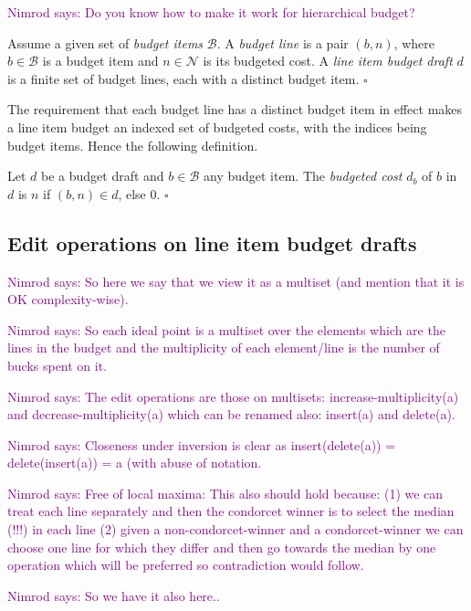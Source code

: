 \documentclass[sigconf]{aamas}  %
\newcommand{\nimrod}[1]{\textcolor{purple}{Nimrod says: #1}}
\newcommand{\qqed}{\hfill$\square$}
\newcommand{\calB}{\mathcal{B}}
\begin{document}
\nimrod{Do you know how to make it work for hierarchical budget?}

\begin{definition}
Assume a given set of \emph{budget items} $\calB$. A \emph{budget line} is a pair $(b,n)$, where $b \in \calB$ is a budget item and $n \in \mathcal{N}$ is its budgeted cost.  A \emph{line item budget draft} $d$ is a finite set of budget lines, each with a distinct budget item.
\qqed
\end{definition}


The requirement that each budget line has a distinct budget item in effect makes a line item budget an indexed set of budgeted costs, with the indices being
budget items.  Hence the following definition.


\begin{definition}
Let $d$ be a budget draft and $b \in \calB$  any budget item. The \emph{budgeted cost} $d_b$ of $b$ in $d$ is $n$ if $(b,n) \in d$, else 0.
\qqed
\end{definition}


\subsection{Edit operations on line item budget drafts}

\nimrod{So here we say that we view it as a multiset (and mention that it is OK complexity-wise).}

\nimrod{So each ideal point is a multiset over the elements which are the lines in the budget and the multiplicity of each element/line is the number of bucks spent on it.}

\nimrod{The edit operations are those on multisets: increase-multiplicity(a) and decrease-multiplicity(a) which can be renamed also: insert(a) and delete(a).}

\nimrod{Closeness under inversion is clear as insert(delete(a)) = delete(insert(a)) = a (with abuse of notation.}

\nimrod{Free of local maxima: This also should hold because:
  (1) we can treat each line separately and then the condorcet winner is to select the median (!!!) in each line
  (2) given a non-condorcet-winner and a condorcet-winner we can choose one line for which they differ and then go towards the median by one operation which will be preferred so contradiction would follow.}
  
\nimrod{So we have it also here..}
\end{document}
